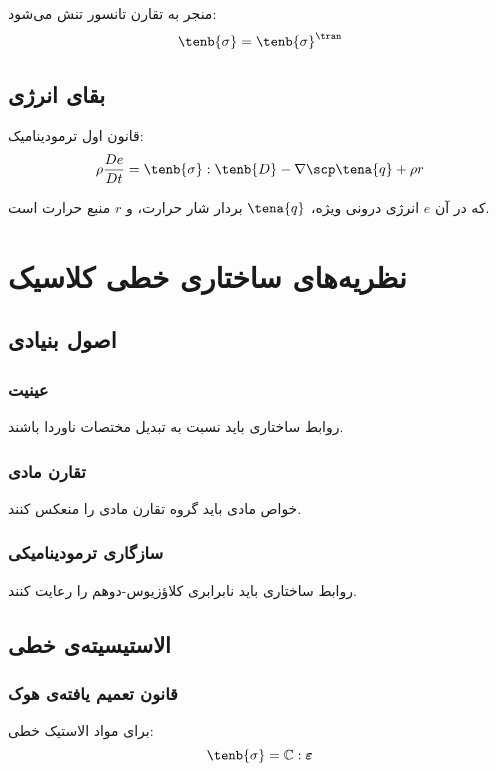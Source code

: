 منجر به تقارن تانسور تنش می‌شود:
\begin{equation}
	\tenb{\sigma} = \tenb{\sigma}^\tran
\end{equation}

\subsection{بقای انرژی}

قانون اول ترمودینامیک:
\begin{equation}
	\rho \frac{De}{Dt} = \tenb{\sigma} : \tenb{D} - \nabla \scp \tena{q} + \rho r
\end{equation}

که در آن $e$ انرژی درونی ویژه، $\tena{q}$ بردار شار حرارت، و $r$ منبع حرارت است.

\section{نظریه‌های ساختاری خطی کلاسیک}

\subsection{اصول بنیادی}

\subsubsection{عینیت}
روابط ساختاری باید نسبت به تبدیل مختصات ناوردا باشند.

\subsubsection{تقارن مادی}
خواص مادی باید گروه تقارن مادی را منعکس کنند.

\subsubsection{سازگاری ترمودینامیکی}
روابط ساختاری باید نابرابری کلاؤزیوس-دوهم را رعایت کنند.

\subsection{الاستیسیته‌ی خطی}

\subsubsection{قانون تعمیم یافته‌ی هوک}
برای مواد الاستیک خطی:
\begin{equation}
	\tenb{\sigma} = \mathbb{C} : \boldsymbol{\varepsilon}
\end{equation}

